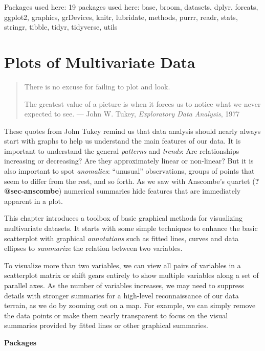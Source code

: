 \documentclass[
  letterpaper,
  10pt,
  krantz2]{krantz}
\begin{document}
Packages used here: 19 packages used here: base, broom, datasets, dplyr,
forcats, ggplot2, graphics, grDevices, knitr, lubridate, methods, purrr,
readr, stats, stringr, tibble, tidyr, tidyverse, utils


\hypertarget{sec-multivariate_plots}{%
\chapter{Plots of Multivariate Data}\label{sec-multivariate_plots}}

\begin{quote}
There is no excuse for failing to plot and look.

The greatest value of a picture is when it forces us to notice what we
never expected to see. --- John W. Tukey, \emph{Exploratory Data
Analysis}, 1977
\end{quote}

These quotes from John Tukey remind us that data analysis should nearly
always start with graphs to help us understand the main features of our
data. It is important to understand the general \emph{patterns} and
\emph{trends}: Are relationships increasing or decreasing? Are they
approximately linear or non-linear? But it is also important to spot
\emph{anomalies}: ``unusual'' observations, groups of points that seem
to differ from the rest, and so forth. As we saw with Anscombe's quartet
(\textbf{?@sec-anscombe}) numerical summaries hide features that are
immediately apparent in a plot.

This chapter introduces a toolbox of basic graphical methods for
visualizing multivariate datasets. It starts with some simple techniques
to enhance the basic scatterplot with graphical \emph{annotations} such
as fitted lines, curves and data ellipses to \emph{summarize} the
relation between two variables.

To visualize more than two variables, we can view all pairs of variables
in a scatterplot matrix or shift gears entirely to show multiple
variables along a set of parallel axes. As the number of variables
increases, we may need to suppress details with stronger summaries for a
high-level reconnaissance of our data terrain, as we do by zooming out
on a map. For example, we can simply remove the data points or make them
nearly transparent to focus on the visual summaries provided by fitted
lines or other graphical summaries.

\textbf{Packages}
\end{document}
